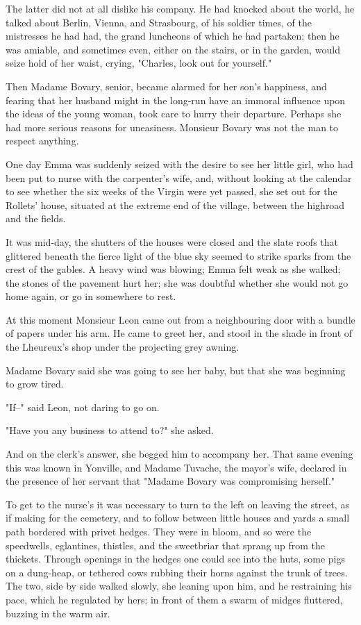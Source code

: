 \documentclass{tufte-book}
\begin{document}
The latter did not at all dislike his company. He had knocked about the
world, he talked about Berlin, Vienna, and Strasbourg, of his soldier
times, of the mistresses he had had, the grand luncheons of which he had
partaken; then he was amiable, and sometimes even, either on the stairs,
or in the garden, would seize hold of her waist, crying, "Charles, look
out for yourself."

Then Madame Bovary, senior, became alarmed for her son's happiness, and
fearing that her husband might in the long-run have an immoral influence
upon the ideas of the young woman, took care to hurry their departure.
Perhaps she had more serious reasons for uneasiness. Monsieur Bovary was
not the man to respect anything.

One day Emma was suddenly seized with the desire to see her little
girl, who had been put to nurse with the carpenter's wife, and, without
looking at the calendar to see whether the six weeks of the Virgin were
yet passed, she set out for the Rollets' house, situated at the extreme
end of the village, between the highroad and the fields.

It was mid-day, the shutters of the houses were closed and the slate
roofs that glittered beneath the fierce light of the blue sky seemed to
strike sparks from the crest of the gables. A heavy wind was blowing;
Emma felt weak as she walked; the stones of the pavement hurt her; she
was doubtful whether she would not go home again, or go in somewhere to
rest.

At this moment Monsieur Leon came out from a neighbouring door with a
bundle of papers under his arm. He came to greet her, and stood in the
shade in front of the Lheureux's shop under the projecting grey awning.

Madame Bovary said she was going to see her baby, but that she was
beginning to grow tired.

"If--" said Leon, not daring to go on.

"Have you any business to attend to?" she asked.

And on the clerk's answer, she begged him to accompany her. That same
evening this was known in Yonville, and Madame Tuvache, the mayor's
wife, declared in the presence of her servant that "Madame Bovary was
compromising herself."

To get to the nurse's it was necessary to turn to the left on leaving
the street, as if making for the cemetery, and to follow between little
houses and yards a small path bordered with privet hedges. They were
in bloom, and so were the speedwells, eglantines, thistles, and the
sweetbriar that sprang up from the thickets. Through openings in
the hedges one could see into the huts, some pigs on a dung-heap, or
tethered cows rubbing their horns against the trunk of trees. The two,
side by side walked slowly, she leaning upon him, and he restraining
his pace, which he regulated by hers; in front of them a swarm of midges
fluttered, buzzing in the warm air.
\end{document}
